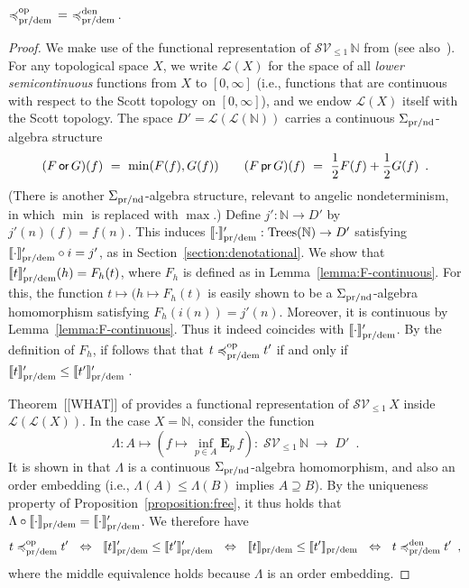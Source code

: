 \begin{lemma}
${\preccurlyeq^{\text{op}}_{\text{pr/dem}}} \, = \,\, \preccurlyeq^{\text{den}}_{\text{pr/dem}}\,$.
\end{lemma}
\begin{proof}
We make use of the functional representation of $\mathcal{S}\mathcal{V}_{\leq 1}\, \mathbb{N}$ from \cite{KeimelP2016} (see also~\cite{JGL-mscs16}). 
For any topological space $X$, we write $\mathcal{L}(X)$ for the space of all
\emph{lower semicontinuous} functions from $X$ to $[0,\infty]$ (i.e., functions that are continuous with respect to the Scott topology on $[0,\infty]$), and we endow $\mathcal{L}(X)$ itself with the Scott topology. The space
$D' = \mathcal{L}(\mathcal{L}(\mathbb{N}))$ carries a continuous $\Sigma_{\text{pr/nd}}$-algebra structure
\[
(F \operatorname{\textsf{or}} G)(f) ~ = ~ \min(F(f), G(f)) \qquad 
(F \operatorname{\textsf{pr}} G)(f) ~ = ~ \frac{1}{2}F(f) + \frac{1}{2}G(f) \enspace .
\]
(There is another $\Sigma_{\text{pr/nd}}$-algebra structure, relevant to angelic nondeterminism, in which  $\min$ is replaced with $\max$.) Define $j' : \mathbb{N} \to D'$ by $j'(n)(f) = f(n)$. This induces $\llbracket \cdot \rrbracket'_{\text{pr/dem}} : \textnormal{Trees}(\mathbb{N}) \to D'$
satisfying  $\llbracket \cdot \rrbracket'_{\text{pr/dem}} \circ i = j'$, as in Section~\ref{section:denotational}.
We show that $\llbracket t \rrbracket'_{\text{pr/dem}} (h) = F_h (t)$, where $F_h$ is defined as in
Lemma~\ref{lemma:F-continuous}. For this, the function $t \mapsto (h \mapsto F_h (t)$ is easily shown to be a $\Sigma_{\text{pr/nd}}$-algebra homomorphism
satisfying $F_h(i(n)) = j'(n)$. Moreover, it is continuous by 
Lemma~\ref{lemma:F-continuous}. Thus it indeed coincides with 
$\llbracket \cdot \rrbracket'_{\text{pr/dem}}$. By the definition of $F_h$, if follows that that
$t \preccurlyeq^{\text{op}}_{\text{pr/dem}} t'$ if and only if 
$\llbracket t \rrbracket'_{\text{pr/dem}} \leq \llbracket t' \rrbracket'_{\text{pr/dem}} \,$.

Theorem~[[WHAT]] of \cite{KeimelP2016} provides a functional representation of 
$\mathcal{S}\mathcal{V}_{\leq 1}\, X$ inside $\mathcal{L}(\mathcal{L}(X))$. In the case $X = \mathbb{N}$, consider the function
\[
\Lambda : A \mapsto \left(f \mapsto \inf_{p \in A} 
  \mathbf{E}_p\, f 
\right) 
 : \; \mathcal{S}\mathcal{V}_{\leq 1}\, \mathbb{N} \;  \to \; D' \enspace .
\]
It is shown in  \cite{KeimelP2016} that $\Lambda$  is a continuous $\Sigma_{\text{pr/nd}}$-algebra homomorphism, and also an order embedding (i.e., $\Lambda(A) \leq \Lambda(B)$ implies $A \supseteq B$). 
By the uniqueness property of Proposition~\ref{proposition:free}, it thus holds that $\Lambda \circ \llbracket \cdot \rrbracket_{\text{pr/dem}} = \llbracket \cdot \rrbracket'_{\text{pr/dem}}$. We therefore have
\[
t \preccurlyeq^{\text{op}}_{\text{pr/dem}} t' ~~ \Leftrightarrow ~ ~
  \llbracket t \rrbracket'_{\text{pr/dem}} \leq \llbracket t' \rrbracket'_{\text{pr/dem}} 
   ~~ \Leftrightarrow ~ ~
   \llbracket t \rrbracket_{\text{pr/dem}} \leq \llbracket t' \rrbracket_{\text{pr/dem}} 
      ~ ~\Leftrightarrow ~ ~
  t \preccurlyeq^{\text{den}}_{\text{pr/dem}} t' \enspace ,
   \]
where the middle equivalence holds because $\Lambda$ is an order embedding.
\end{proof}

